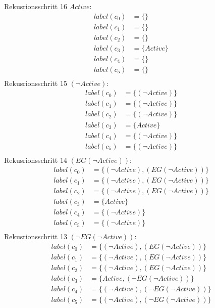 Rekusrionsschritt 16 $Active$:
\begin{align*}
label(c_0)&=\{\}\\
label(c_1)&=\{\}\\
label(c_2)&=\{\}\\
label(c_3)&=\{Active\}\\
label(c_4)&=\{\}\\
label(c_5)&=\{\}\\
\end{align*}
Rekusrionsschritt 15 $(\neg Active)$:
\begin{align*}
label(c_0)&=\{(\neg Active)\}\\
label(c_1)&=\{(\neg Active)\}\\
label(c_2)&=\{(\neg Active)\}\\
label(c_3)&=\{Active\}\\
label(c_4)&=\{(\neg Active)\}\\
label(c_5)&=\{(\neg Active)\}\\
\end{align*}
Rekusrionsschritt 14 $(EG(\neg Active))$:
\begin{align*}
label(c_0)&=\{(\neg Active),(EG(\neg Active))\}\\
label(c_1)&=\{(\neg Active),(EG(\neg Active))\}\\
label(c_2)&=\{(\neg Active),(EG(\neg Active))\}\\
label(c_3)&=\{Active\}\\
label(c_4)&=\{(\neg Active)\}\\
label(c_5)&=\{(\neg Active)\}\\
\end{align*}
Rekusrionsschritt 13 $(\neg EG(\neg Active))$:
\begin{align*}
label(c_0)&=\{(\neg Active),(EG(\neg Active))\}\\
label(c_1)&=\{(\neg Active),(EG(\neg Active))\}\\
label(c_2)&=\{(\neg Active),(EG(\neg Active))\}\\
label(c_3)&=\{Active,(\neg EG(\neg Active))\}\\
label(c_4)&=\{(\neg Active),(\neg EG(\neg Active))\}\\
label(c_5)&=\{(\neg Active),(\neg EG(\neg Active))\}\\
\end{align*}

